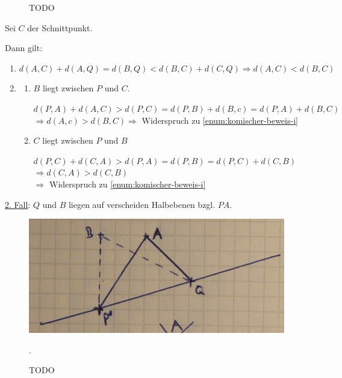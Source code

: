 \begin{beweis}
\begin{beweis}
\begin{beweis}
            \begin{figure}
                \centering
                
                \caption{TODO}
                \label{fig:bild-3}
            \end{figure}

            Sei $C$ der Schnittpunkt.

            Dann gilt:
            \begin{enumerate}[label=(\roman*)]
                \item $d(A, C) + d(A, Q) = d(B, Q) < d(B, C) + d(C, Q) \Rightarrow d(A, C) < d(B, C)$ \label{enum:komischer-beweis-i}
                \item \begin{enumerate}[label=\alph*)]
                        \item $B$ liegt zwischen $P$ und $C$.

                              $d(P,A) + d(A, C) > d(P,C) = d(P,B) + d(B,c) = d(P,A) + d(B,C)$
                              $\Rightarrow d(A,c) > d(B,C) \Rightarrow$ Widerspruch zu \ref{enum:komischer-beweis-i}
                        \item $C$ liegt zwischen $P$ und $B$

                              $d(P,C) + d(C,A) > d(P,A) = d(P,B) = d(P,C) + d(C, B)$\\
                              $\Rightarrow d(C, A) > d(C, B)$\\
                              $\Rightarrow$ Widerspruch zu \ref{enum:komischer-beweis-i}
                    \end{enumerate}
            \end{enumerate}

            \underline{2. Fall}: $Q$ und $B$ liegen auf verscheiden Halbebenen bzgl. $PA$.

            \begin{figure}
                \centering
                \includegraphics[width=0.5\linewidth, keepaspectratio]{figures/todo/bild-4.jpg}
                \caption{TODO}.
                \label{fig:bild-4}
            \end{figure}


\end{beweis}
\end{beweis}
\end{beweis}
